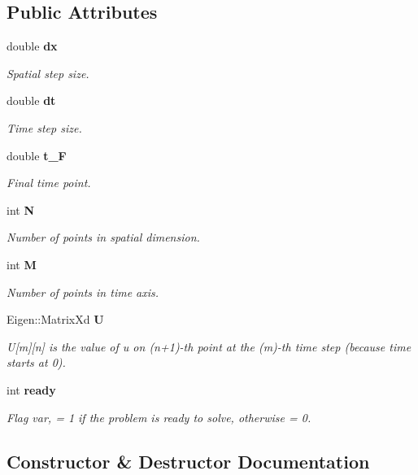 \subsection*{Public Attributes}
\begin{CompactItemize}
\item 
double \bf{dx}
\begin{CompactList}\small\item\em Spatial step size. \item\end{CompactList}\item 
double \bf{dt}
\begin{CompactList}\small\item\em Time step size. \item\end{CompactList}\item 
double \bf{t\_\-F}
\begin{CompactList}\small\item\em Final time point. \item\end{CompactList}\item 
int \bf{N}
\begin{CompactList}\small\item\em Number of points in spatial dimension. \item\end{CompactList}\item 
int \bf{M}
\begin{CompactList}\small\item\em Number of points in time axis. \item\end{CompactList}\item 
Eigen::Matrix\-Xd \bf{U}
\begin{CompactList}\small\item\em U[m][n] is the value of u on (n+1)-th point at the (m)-th time step (because time starts at 0). \item\end{CompactList}\item 
int \bf{ready}
\begin{CompactList}\small\item\em Flag var, = 1 if the problem is ready to solve, otherwise = 0. \item\end{CompactList}\end{CompactItemize}


\subsection{Constructor \& Destructor Documentation}
